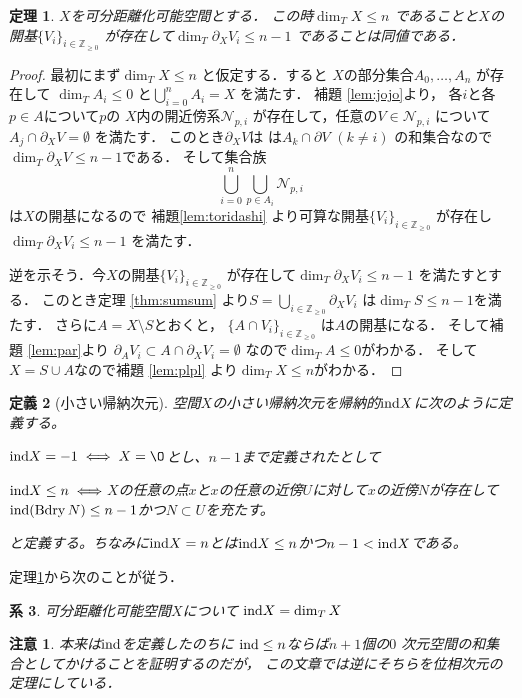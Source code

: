 \documentclass[leqno, a4paper, 12pt]{jsarticle}
\newtheorem{thm}{定理}
\newtheorem{cor}[thm]{系}
\newtheorem{df}[thm]{定義}
\newtheorem*{rmk}{注意}
\newcommand{\zz}{\mathbb{Z}}
\DeclareMathOperator{\bd}{Bdry}
\newcommand{\ind}{\text{{\rm ind}}}
\begin{document}
\begin{thm}\label{thm:boundary}
$X$を可分距離化可能空間とする．
この時$\dim_{T} X\le n$
であることと$X$の開基$\{V_{i}\}_{i\in \zz_{\ge 0}}$
が存在して$\dim_{T}\partial_{X} V_{i}\le n-1$
であることは同値である．
\end{thm}
\begin{proof}
最初にまず$\dim_{T} X\le n$
と仮定する．すると
$X$の部分集合$A_{0}, \dots, A_{n}$
が存在して
$\dim_{T}A_{i}\le 0$
と$\bigcup_{i=0}^{n}A_{i}=X$
を満たす．
補題 \ref{lem:jojo}より，
各$i$と各$p\in A$について$p$の
$X$内の開近傍系$\mathcal{N}_{p, i}$
が存在して，任意の$V\in \mathcal{N}_{p, i}$
について
$A_{j}\cap \partial_{X} V=\emptyset$
を満たす．
このとき$\partial_{X}V$は
は$A_{k}\cap \partial V$ $(k\neq i)$
の和集合なので$\dim_{T}\partial_{X}V\le n-1$である．
そして集合族
\[
\bigcup_{i=0}^{n}\bigcup_{p\in A_{i}}\mathcal{N}_{p, i}
\]
は$X$の開基になるので
補題\ref{lem:toridashi}
より可算な開基$\{V_{i}\}_{i\in \zz_{\ge 0}}$
が存在し$\dim_{T}\partial_{X} V_{i}\le n-1$
を満たす．

逆を示そう．今$X$の開基$\{V_{i}\}_{i\in \zz_{\ge 0}}$
が存在して$\dim_{T}\partial_{X} V_{i}\le n-1$
を満たすとする．
このとき定理 \ref{thm:sumsum}
より$S=\bigcup_{i\in \zz_{\ge 0}}\partial_{X}V_{i}$
は$\dim_{T}S\le n-1$を満たす．
さらに$A=X\setminus S$とおくと，
$\{A\cap V_{i}\}_{i\in \zz_{\ge 0}}$
は$A$の開基になる．
そして補題 \ref{lem:par}より
$\partial_{A}V_{i}\subset A\cap \partial_{X}V_{i}=\emptyset$
なので$\dim_{T}A\le 0$がわかる．
そして$X=S\cup A$なので補題 \ref{lem:plpl}
より$\dim_{T} X\le n$がわかる．
\end{proof}

\begin{df}[小さい帰納次元]
空間$X$の小さい帰納次元を帰納的$\ind X$に次のように定義する。\par
$\ind X=-1\iff X=\O$とし、$n-1$まで定義されたとして\par
$\ind X\le n\iff$$X$の任意の点$x$と$x$の任意の近傍$U$に対して$x$の近傍$N$が存在して$\ind (\bd N)\le n-1$かつ$N\subset U$を充たす。\par
と定義する。ちなみに$\ind X=n$とは$\ind X\le n$かつ$n-1<\ind X$である。
\end{df}

定理\ref{thm:boundary}から次のことが従う．
\begin{cor}\label{cor:inddim}
可分距離化可能空間$X$について
$\ind X=\dim_{T}X$
\end{cor}

\begin{rmk}
本来は$\ind$を定義したのちに
$\ind \le n$ならば$n+1$個の$0$
次元空間の和集合としてかけることを証明するのだが，
この文章では逆にそちらを位相次元の定理にしている．
\end{rmk}
\end{document}
